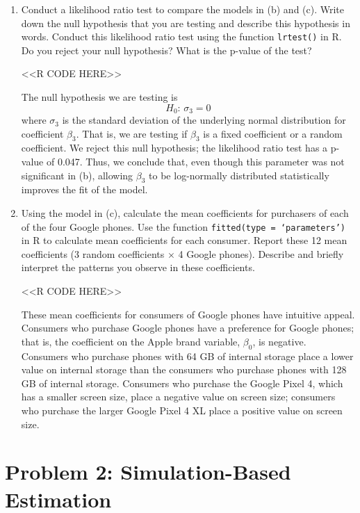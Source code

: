 \documentclass[11pt,letterpaper]{article}
\begin{document}
\begin{enumerate}[label=\alph*., leftmargin=*]
	\item Conduct a likelihood ratio test to compare the models in (b) and (c). Write down the null hypothesis that you are testing and describe this hypothesis in words. Conduct this likelihood ratio test using the function \texttt{lrtest()} in R. Do you reject your null hypothesis? What is the p-value of the test?

	<<R CODE HERE>>

	The null hypothesis we are testing is
	$$H_0 \text{: } \sigma_3 = 0$$
	where $\sigma_3$ is the standard deviation of the underlying normal distribution for coefficient $\beta_3$. That is, we are testing if $\beta_3$ is a fixed coefficient or a random coefficient. We reject this null hypothesis; the likelihood ratio test has a p-value of 0.047. Thus, we conclude that, even though this parameter was not significant in (b), allowing $\beta_3$ to be log-normally distributed statistically improves the fit of the model.

	\item Using the model in (c), calculate the mean coefficients for purchasers of each of the four Google phones. Use the function \texttt{fitted(type = `parameters')} in R to calculate mean coefficients for each consumer. Report these 12 mean coefficients (3 random coefficients $\times$ 4 Google phones). Describe and briefly interpret the patterns you observe in these coefficients.

	<<R CODE HERE>>

	These mean coefficients for consumers of Google phones have intuitive appeal. Consumers who purchase Google phones have a preference for Google phones; that is, the coefficient on the Apple brand variable, $\beta_0$, is negative. Consumers who purchase phones with 64 GB of internal storage place a lower value on internal storage than the consumers who purchase phones with 128 GB of internal storage. Consumers who purchase the Google Pixel 4, which has a smaller screen size, place a negative value on screen size; consumers who purchase the larger Google Pixel 4 XL place a positive value on screen size.
\end{enumerate}

\section*{Problem 2: Simulation-Based Estimation}
\end{document}
